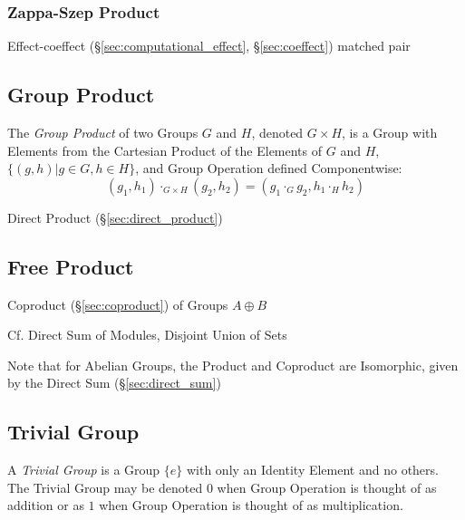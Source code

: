 \subsubsection{Zappa-Szep Product}\label{sec:zappa_szep}

Effect-coeffect (\S\ref{sec:computational_effect},
\S\ref{sec:coeffect}) matched pair



\subsection{Group Product}\label{sec:group_product}

The \emph{Group Product} of two Groups $G$ and $H$, denoted $G \times
H$, is a Group with Elements from the Cartesian Product of the
Elements of $G$ and $H$, $\{(g,h) | g \in G, h \in H\}$, and Group
Operation defined Componentwise:
\[
    (g_1, h_1) \cdot_{G \times H} (g_2, h_2)
    = (g_1 \cdot_G g_2, h_1 \cdot_H h_2)
\]

Direct Product (\S\ref{sec:direct_product})



\subsection{Free Product}\label{sec:free_product}

Coproduct (\S\ref{sec:coproduct}) of Groups $A \oplus B$

\fist Cf. Direct Sum of Modules, Disjoint Union of Sets

\fist Note that for Abelian Groups, the Product and Coproduct
are Isomorphic, given by the Direct Sum (\S\ref{sec:direct_sum})



\subsection{Trivial Group}\label{sec:trivial_group}

A \emph{Trivial Group} is a Group $\{e\}$ with only an Identity Element and no
others. The Trivial Group may be denoted $0$ when Group Operation is thought of
as addition or as $1$ when Group Operation is thought of as multiplication.

